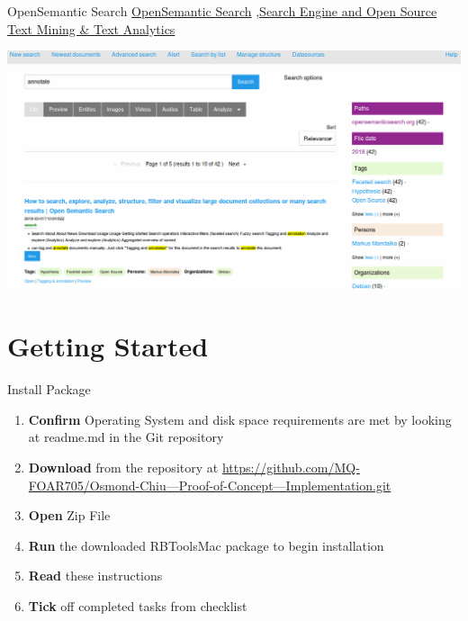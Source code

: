 \documentclass[10pt,a4paper]{article}
\begin{document}
\begin{textbox}{OpenSemantic Search}
\href{https://www.opensemanticsearch.org}{OpenSemantic Search} \sep \href{https://www.opensemanticsearch.org}{Search Engine and Open Source Text Mining & Text Analytics}

\includegraphics[width=\textwidth]{search.png}

\end{textbox}



\section{Getting Started}



\begin{textbox}{Install Package}
 

  

\begin{enumerate}
\item \textbf{Confirm} Operating System and disk space requirements are met by looking at readme.md in the Git repository
\item \textbf{Download} from the repository at \href{https://github.com/MQ-FOAR705/Osmond-Chiu---Proof-of-Concept---Implementation.git}{https://github.com/MQ-FOAR705/Osmond-Chiu---Proof-of-Concept---Implementation.git}
\item \textbf{Open} Zip File
\item \textbf{Run} the downloaded RBToolsMac package to begin installation
\item \textbf{Read} these instructions
\item \textbf{Tick} off completed tasks from checklist
\end{enumerate}

\end{textbox}
\end{document}
